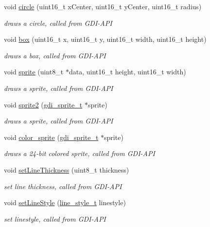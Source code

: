 \begin{CompactItemize}
void \hyperlink{group__graphic__device_gc94c3233de7ff3e87551f5ee9717b1bb}{circle} (uint16\_\-t xCenter, uint16\_\-t yCenter, uint16\_\-t radius)
\begin{CompactList}\small\item\em draws a circle, called from GDI-API \item\end{CompactList}\item 
void \hyperlink{group__graphic__device_g8bdd86d104cca372768afe13dd8e66b4}{box} (uint16\_\-t x, uint16\_\-t y, uint16\_\-t width, uint16\_\-t height)
\begin{CompactList}\small\item\em draws a box, called from GDI-API \item\end{CompactList}\item 
void \hyperlink{group__graphic__device_g2aea83565e4b3416a0920d9d6d925ed9}{sprite} (uint8\_\-t $\ast$data, uint16\_\-t height, uint16\_\-t width)
\begin{CompactList}\small\item\em draws a sprite, called from GDI-API \item\end{CompactList}\item 
void \hyperlink{group__graphic__device_gaea2e351a7efbc2ec4be0f4688593fdb}{sprite2} (\hyperlink{struct__gdi__sprite}{gdi\_\-sprite\_\-t} $\ast$sprite)
\begin{CompactList}\small\item\em draws a sprite, called from GDI-API \item\end{CompactList}\item 
void \hyperlink{group__graphic__device_ga7267153b94e4ea20df9231fbc208a19}{color\_\-sprite} (\hyperlink{struct__gdi__sprite}{gdi\_\-sprite\_\-t} $\ast$sprite)
\begin{CompactList}\small\item\em draws a 24-bit colored sprite, called from GDI-API \item\end{CompactList}\item 
void \hyperlink{group__graphic__device_ge1e3f4164ddb7ede972dfd4573c05739}{setLineThickness} (uint8\_\-t thickness)
\begin{CompactList}\small\item\em set line thickness, called from GDI-API \item\end{CompactList}\item 
void \hyperlink{group__graphic__device_g457c68dc52c4aed28ac3b53f7325b00d}{setLineStyle} (\hyperlink{group__hgdi__types_gdfccdb9380d340f00e646a1fd04b79d9}{line\_\-style\_\-t} linestyle)
\begin{CompactList}\small\item\em set linestyle, called from GDI-API \item\end{CompactList}\end{CompactItemize}


